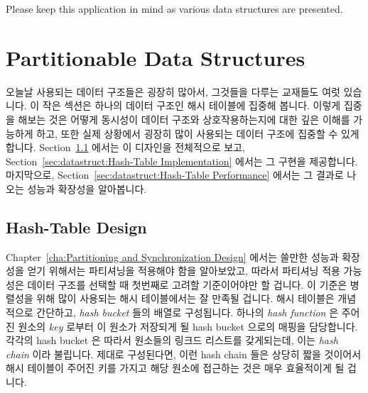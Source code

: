 Please keep this application in mind as various data structures are presented.
\fi

\section{Partitionable Data Structures}
\label{sec:datastruct:Partitionable Data Structures}

오늘날 사용되는 데이터 구조들은 굉장히 많아서, 그것들을 다루는 교재들도 여럿
있습니다.
이 작은 섹션은 하나의 데이터 구조인 해시 테이블에 집중해 봅니다.
이렇게 집중을 해보는 것은 어떻게 동시성이 데이터 구조와 상호작용하는지에 대한
깊은 이해를 가능하게 하고, 또한 실제 상황에서 굉장히 많이 사용되는 데이터
구조에 집중할 수 있게 합니다.
Section~\ref{sec:datastruct:Hash-Table Design} 에서는 이 디자인을 전체적으로
보고,
Section~\ref{sec:datastruct:Hash-Table Implementation} 에서는 그 구현을
제공합니다.
마지막으로,
Section~\ref{sec:datastruct:Hash-Table Performance} 에서는 그 결과로 나오는
성능과 확장성을 알아봅니다.

\subsection{Hash-Table Design}
\label{sec:datastruct:Hash-Table Design}

Chapter~\ref{cha:Partitioning and Synchronization Design}
에서는 쓸만한 성능과 확장성을 얻기 위해서는 파티셔닝을 적용해야 함을
알아보았고, 따라서 파티셔닝 적용 가능성은 데이터 구조를 선택할 때 첫번째로
고려할 기준이어야만 할 겁니다.
이 기준은 병렬성을 위해 많이 사용되는 해시 테이블에서는 잘 만족될 겁니다.
해시 테이블은 개념적으로 간단하고, \emph{hash bucket} 들의 배열로 구성됩니다.
하나의 \emph{hash function} 은 주어진 원소의 \emph{key} 로부터 이 원소가
저장되게 될 hash bucket 으로의 매핑을 담당합니다.
각각의 hash bucket 은 따라서 원소들의 링크드 리스트를 갖게되는데, 이는
\emph{hash chain} 이라 불립니다.
제대로 구성된다면, 이런 hash chain 들은 상당히 짧을 것이어서 해시 테이블이
주어진 키를 가지고 해당 원소에 접근하는 것은 매우 효율적이게 될 겁니다.
\iffalse


